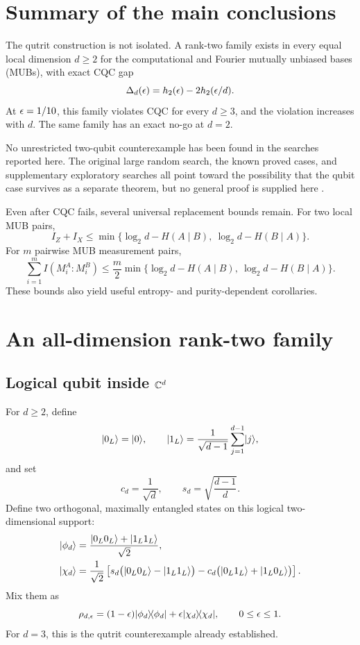 \section{Summary of the main conclusions}

The qutrit construction is not isolated. A rank-two family exists in every equal local dimension $d\ge2$ for the computational and Fourier mutually unbiased bases (MUBs), with exact CQC gap
\begin{equation}
\Delta_d(\epsilon)=h_2(\epsilon)-2h_2(\epsilon/d).
\end{equation}
At $\epsilon=1/10$, this family violates CQC for every $d\ge3$, and the violation increases with $d$. The same family has an exact no-go at $d=2$.

No unrestricted two-qubit counterexample has been found in the searches reported here. The original large random search, the known proved cases, and supplementary exploratory searches all point toward the possibility that the qubit case survives as a separate theorem, but no general proof is supplied here \cite{Schneeloch2014}.

Even after CQC fails, several universal replacement bounds remain. For two local MUB pairs,
\begin{equation}
I_Z+I_X\le \min\{\log_2 d-H(A\mid B),\ \log_2d-H(B\mid A)\}.
\end{equation}
For $m$ pairwise MUB measurement pairs,
\begin{equation}
\sum_{i=1}^{m} I(M_i^A:M_i^B)
\le \frac{m}{2}\min\{\log_2 d-H(A\mid B),\ \log_2d-H(B\mid A)\}.
\end{equation}
These bounds also yield useful entropy- and purity-dependent corollaries.

\section{An all-dimension rank-two family}

\subsection{Logical qubit inside $\mathbb{C}^d$}

For $d\ge2$, define
\begin{equation}
\lvert 0_L\rangle=\lvert 0\rangle,
\qquad
\lvert 1_L\rangle=\frac{1}{\sqrt{d-1}}\sum_{j=1}^{d-1}\lvert j\rangle,
\end{equation}
and set
\begin{equation}
 c_d=\frac{1}{\sqrt d},
 \qquad
 s_d=\sqrt{\frac{d-1}{d}}.
\end{equation}
Define two orthogonal, maximally entangled states on this logical two-dimensional support:
\begin{align}
\lvert \phi_d\rangle
 &=\frac{\lvert 0_L0_L\rangle+\lvert 1_L1_L\rangle}{\sqrt2},\\
\lvert \chi_d\rangle
 &=\frac{1}{\sqrt2}\left[
 s_d\bigl(\lvert 0_L0_L\rangle-\lvert 1_L1_L\rangle\bigr)
 -c_d\bigl(\lvert 0_L1_L\rangle+\lvert 1_L0_L\rangle\bigr)
 \right].
\end{align}
Mix them as
\begin{equation}
\rho_{d,\epsilon}=(1-\epsilon)\lvert \phi_d\rangle\!\langle \phi_d\rvert+\epsilon\lvert \chi_d\rangle\!\langle \chi_d\rvert,
\qquad 0\le\epsilon\le1.
\end{equation}
For $d=3$, this is the qutrit counterexample already established.

